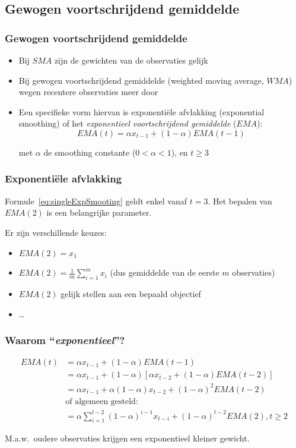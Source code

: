 \documentclass[aspectratio=169]{beamer}
\begin{document}
\subsection{Gewogen voortschrijdend gemiddelde}

\begin{frame}
  \frametitle{Gewogen voortschrijdend gemiddelde}

  \begin{itemize}
    \item Bij $SMA$ zijn de gewichten van de observaties gelijk
    \item Bij gewogen voortschrijdend gemiddelde (weighted moving average, $WMA$) wegen recentere observaties meer door
    \item Een specifieke vorm hiervan is exponentiële afvlakking (exponential smoothing) of het \emph{exponentieel voortschrijdend gemiddelde} ($EMA$):
      \begin{equation}
        EMA(t) = \alpha x_{t-1} + (1-\alpha) EMA(t-1)
        \label{eq:singleExpSmooting}
      \end{equation}

      met $\alpha$ de smoothing constante ($0 < \alpha < 1$), en $t \geq 3$
  \end{itemize}
\end{frame}

\begin{frame}
  \frametitle{Exponentiële afvlakking}

  Formule~\ref{eq:singleExpSmooting} geldt enkel vanaf $t=3$. Het bepalen van $EMA(2)$ is een belangrijke parameter.

  Er zijn verschillende keuzes:

  \begin{itemize}
    \item $EMA(2) = x_1$
    \item $EMA(2) = \frac{1}{m} \sum_{i=1}^{m} x_i$ (dus gemiddelde van de eerste $m$ observaties)
    \item $EMA(2)$ gelijk stellen aan een bepaald objectief
    \item \ldots
  \end{itemize}
\end{frame}

\begin{frame}
  \frametitle{Waarom ``\emph{exponentieel}''?}

  \begin{align*}
    EMA(t) &= \alpha x_{t-1} + (1-\alpha) EMA(t-1)                                           \\
           &= \alpha x_{t-1} + (1-\alpha)\left[\alpha x_{t-2} + (1-\alpha)EMA(t - 2)\right]  \\
           &= \alpha x_{t-1} + \alpha (1-\alpha)x_{t-2} + (1-\alpha)^{2} EMA(t - 2)          \\
           &  \text{of algemeen gesteld:} \\
           &= \alpha \sum_{i=1}^{t-2}(1-\alpha)^{i-1}x_{t-i} + (1-\alpha)^{t-2} EMA(2), t \geq 2
  \end{align*}

  M.a.w.~oudere observaties krijgen een exponentieel kleiner gewicht.
\end{frame}
\end{document}
